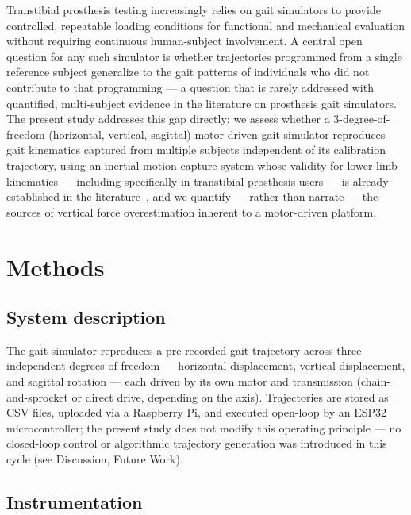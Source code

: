 \documentclass[times,sagev]{sagej}
\begin{document}
Transtibial prosthesis testing increasingly relies on gait simulators to
provide controlled, repeatable loading conditions for functional and
mechanical evaluation without requiring continuous human-subject
involvement. A central open question for any such simulator is whether
trajectories programmed from a single reference subject generalize to
the gait patterns of individuals who did not contribute to that
programming --- a question that is rarely addressed with quantified,
multi-subject evidence in the literature on prosthesis gait simulators.
The present study addresses this gap directly: we assess whether a
3-degree-of-freedom (horizontal, vertical, sagittal) motor-driven gait
simulator reproduces gait kinematics captured from multiple subjects
independent of its calibration trajectory, using an inertial motion
capture system whose validity for lower-limb kinematics --- including
specifically in transtibial prosthesis users --- is already established
in the literature~\cite{PENDIENTE_iSen_transtibial}, and we quantify ---
rather than narrate --- the sources of vertical force overestimation
inherent to a motor-driven platform.

\section{Methods}

\subsection{System description}

The gait simulator reproduces a pre-recorded gait trajectory across
three independent degrees of freedom --- horizontal displacement,
vertical displacement, and sagittal rotation --- each driven by its own
motor and transmission (chain-and-sprocket or direct drive, depending on
the axis). Trajectories are stored as CSV files, uploaded via a
Raspberry Pi, and executed open-loop by an ESP32 microcontroller; the
present study does not modify this operating principle --- no
closed-loop control or algorithmic trajectory generation was introduced
in this cycle (see Discussion, Future Work). %

\subsection{Instrumentation}
\end{document}
